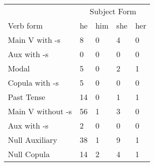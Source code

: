 \begin{table}[]
\begin{minipage}{0.5\textwidth}
    \centering
    \begin{tabular}{@{}lllll@{}}
        \toprule
            &\multicolumn{4}{c}{Subject Form}\\
            \cline{2-5}
        Verb form & he & him & she & her \\
        \midrule
        Main V with -s & 8 & 0 & 4 & 0 \\
        Aux with -s & 0 & 0 & 0 & 0 \\
        Modal & 5 & 0 & 2 & 1 \\
        Copula with -s & 5 & 0 & 0 & 0 \\
        Past Tense & 14 & 0 & 1 & 1 \\
        \hline
        Main V without -s & 56 & 1 & 3 & 0 \\
        Aux with -s & 2 & 0 & 0 & 0 \\
        Null Auxiliary & 38 & 1 & 9 & 1 \\
        Null Copula & 14 & 2 & 4 & 1 \\
        \bottomrule
    \end{tabular}
\end{minipage}
\end{table}
